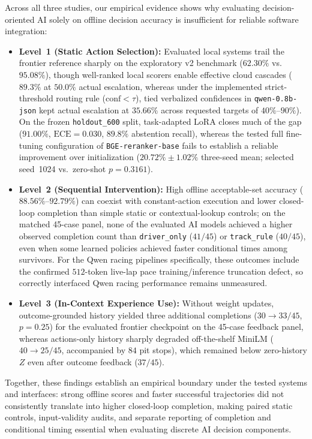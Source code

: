 \documentclass[11pt,a4paper]{article}
\begin{document}
Across all three studies, our empirical evidence shows why evaluating decision-oriented AI solely on offline decision accuracy is insufficient for reliable software integration:
\begin{itemize}[leftmargin=1.5em,itemsep=2pt]
  \item \textbf{Level~1 (Static Action Selection):} Evaluated local systems trail the frontier reference sharply on the exploratory v2 benchmark ($62.30\%$ vs.\ $95.08\%$), though well-ranked local scorers enable effective cloud cascades ($89.3\%$ at $50.0\%$ actual escalation, whereas under the implemented strict-threshold routing rule ($\text{conf} < \tau$), tied verbalized confidences in \texttt{qwen-0.8b-json} kept actual escalation at $35.66\%$ across requested targets of $40\%$--$90\%$). On the frozen \texttt{holdout\_600} split, task-adapted LoRA closes much of the gap ($91.00\%$, $\text{ECE}=0.030$, $89.8\%$ abstention recall), whereas the tested full fine-tuning configuration of \texttt{BGE-reranker-base} fails to establish a reliable improvement over initialization ($20.72\% \pm 1.02\%$ three-seed mean; selected seed~1024 vs.\ zero-shot $p = 0.3161$).
  \item \textbf{Level~2 (Sequential Intervention):} High offline acceptable-set accuracy ($88.56\%$--$92.79\%$) can coexist with constant-action execution and lower closed-loop completion than simple static or contextual-lookup controls; on the matched 45-case panel, none of the evaluated AI models achieved a higher observed completion count than \texttt{driver\_only} ($41/45$) or \texttt{track\_rule} ($40/45$), even when some learned policies achieved faster conditional times among survivors. For the Qwen racing pipelines specifically, these outcomes include the confirmed $512$-token live-lap pace training/inference truncation defect, so correctly interfaced Qwen racing performance remains unmeasured.
  \item \textbf{Level~3 (In-Context Experience Use):} Without weight updates, outcome-grounded history yielded three additional completions ($30 \rightarrow 33/45$, $p=0.25$) for the evaluated frontier checkpoint on the 45-case feedback panel, whereas actions-only history sharply degraded off-the-shelf MiniLM ($40 \rightarrow 25/45$, accompanied by $84$ pit stops), which remained below zero-history $Z$ even after outcome feedback ($37/45$).
\end{itemize}

Together, these findings establish an empirical boundary under the tested systems and interfaces: strong offline scores and faster successful trajectories did not consistently translate into higher closed-loop completion, making paired static controls, input-validity audits, and separate reporting of completion and conditional timing essential when evaluating discrete AI decision components.
\end{document}
